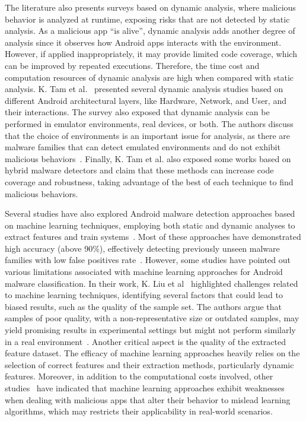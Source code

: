 The literature also presents surveys based on dynamic analysis, where malicious behavior is analyzed at runtime, exposing risks that are not detected by static analysis. As a malicious app ``is alive'', dynamic analysis adds another degree of analysis since it observes how Android apps interacts with the environment. However, if applied inappropriately, it may provide limited code coverage, which can be improved by repeated executions. Therefore, the time cost and computation resources of dynamic analysis are high when compared with static analysis. K. Tam et al.~\cite{DBLP:journals/csur/TamFASC17} presented several dynamic analysis studies based on different Android architectural layers, like Hardware, Network, and User, and their interactions. The survey also exposed that dynamic analysis can be performed in emulator environments, real devices, or both. The authors discuss that the choice of environments is an important issue for analysis, as there are malware families that can detect emulated environments and do not exhibit malicious behaviors~\cite{DBLP:journals/csr/SihagVS21}. Finally, K. Tam et al. also exposed some works based on hybrid malware detectors and claim that these methods can increase code coverage and robustness, taking advantage of the best of each technique to find malicious behaviors.

Several studies have also explored Android malware detection approaches based on machine learning techniques, employing both static and dynamic analyses to extract features and train systems~\cite{DBLP:journals/access/LiuXXZSL20}. Most of these approaches have demonstrated high accuracy (above 90\%), effectively detecting previously unseen malware families with low false positives rate~\cite{DBLP:journals/corr/abs-2001-09406}. However, some studies have pointed out various limitations associated with machine learning approaches for Android malware classification. In their work, K. Liu et al~\cite{DBLP:journals/access/LiuXXZSL20} highlighted challenges related to machine learning techniques, identifying several factors that could lead to biased results, such as the quality of the sample set. The authors argue that samples of poor quality, with a non-representative size or outdated samples, may yield promising results in experimental settings but might not perform similarly in a real environment~\cite{DBLP:journals/ese/AllixBJKST16}. Another critical aspect is the quality of the extracted feature dataset. The efficacy of machine learning approaches heavily relies on the selection of correct features and their extraction methods, particularly dynamic features. Moreover, in addition to the computational costs involved, other studies~\cite{DBLP:journals/tdsc/DemontisMBMARCG19,DBLP:journals/csur/GardinerN16} have indicated that machine learning approaches exhibit weaknesses when dealing with malicious apps that alter their behavior to mislead learning algorithms, which may restricts their applicability in real-world scenarios.
